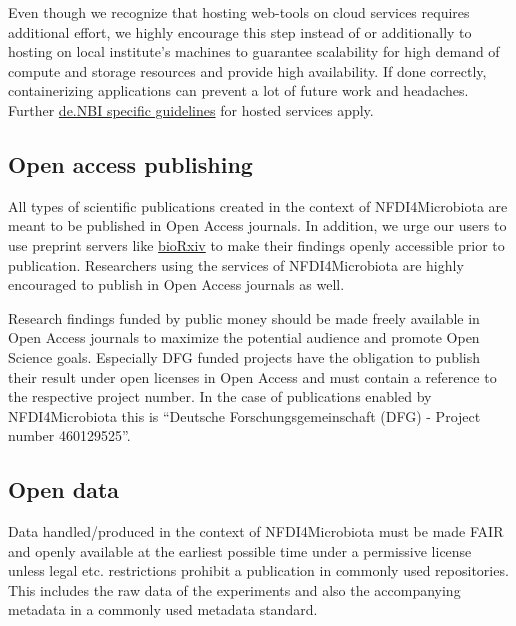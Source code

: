 \documentclass[
  paper=a4,
  ,captions=tableheading
]{scrartcl}
\renewenvironment{quote}{\begin{shaded*}\begin{em}}{\end{em}\end{shaded*}}
\renewenvironment{quote}{\begin{customblockquote}\list{}{\rightmargin=0em\leftmargin=0em}%
\item\relax\color{blockquote-text}\ignorespaces}{\unskip\unskip\endlist\end{customblockquote}}
\begin{document}
\begin{quote}
Even though we recognize that hosting web-tools on cloud services
requires additional effort, we highly encourage this step instead of or
additionally to hosting on local institute's machines to guarantee
scalability for high demand of compute and storage resources and provide
high availability. If done correctly, containerizing applications can
prevent a lot of future work and headaches. Further
\href{https://www.denbi.de/images/Service/deNBI_ELIXIR-DE_Gudielines_Services_version_20200729.pdf}{de.NBI
specific guidelines} for hosted services apply.
\end{quote}

\hypertarget{open-access-publishing}{%
\subsection{Open access publishing}\label{open-access-publishing}}

All types of scientific publications created in the context of
NFDI4Microbiota are meant to be published in Open Access journals. In
addition, we urge our users to use preprint servers like
\href{https://www.biorxiv.org/}{bioRxiv} to make their findings openly
accessible prior to publication. Researchers using the services of
NFDI4Microbiota are highly encouraged to publish in Open Access journals
as well.

\begin{quote}
Research findings funded by public money should be made freely available
in Open Access journals to maximize the potential audience and promote
Open Science goals. Especially DFG funded projects have the obligation
to publish their result under open licenses in Open Access and must
contain a reference to the respective project number. In the case of
publications enabled by NFDI4Microbiota this is ``Deutsche
Forschungsgemeinschaft (DFG) - Project number 460129525''.
\end{quote}

\hypertarget{open-data}{%
\subsection{Open data}\label{open-data}}

Data handled/produced in the context of NFDI4Microbiota must be made
FAIR and openly available at the earliest possible time under a
permissive license unless legal etc. restrictions prohibit a publication
in commonly used repositories. This includes the raw data of the
experiments and also the accompanying metadata in a commonly used
metadata standard.
\end{document}
